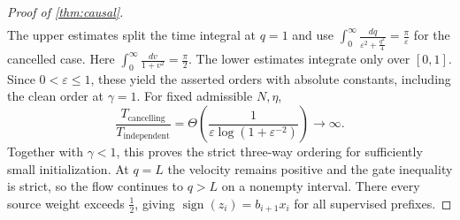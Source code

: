 \begin{proof}[Proof of \cref{thm:causal}]
\begin{align*}
\end{align*}
The upper estimates split the time integral at $q=1$ and use
$\int_0^\infty\tfrac{dq}{\varepsilon^2+\tfrac{q^2}{4}}=\tfrac{\pi}{\varepsilon}$ for the cancelled case.
Here $\int_0^\infty\tfrac{dv}{1+v^2}=\tfrac{\pi}{2}$.
The lower estimates integrate only over $[0,1]$.
Since $0<\varepsilon\le1$, these yield the asserted orders with absolute constants, including the clean order at $\gamma=1$.
For fixed admissible $N,\eta$,
\[
 \frac{T_{\mathrm{cancelling}}}{T_{\mathrm{independent}}}
 =\Theta\!\left(\frac{1}{\varepsilon\log(1+\varepsilon^{-2})}\right)\longrightarrow\infty.
\]
Together with $\gamma<1$, this proves the strict three-way ordering for sufficiently small initialization.
At $q=L$ the velocity remains positive and the gate inequality is strict, so the flow continues to $q>L$ on a nonempty interval.
There every source weight exceeds $\tfrac{1}{2}$, giving $\operatorname{sign}(z_i)=b_{i+1}x_i$ for all supervised prefixes.\qedhere
\end{proof}
